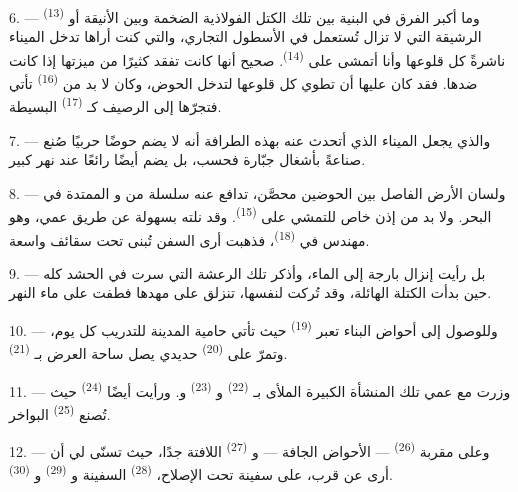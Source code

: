 6. --- وما أكبر الفرق في البنية بين تلك الكتل الفولاذية الضخمة وبين
 الأنيقة أو 
\textsuperscript{(13)} الرشيقة التي لا تزال تُستعمل في الأسطول التجاري، والتي
كنت أراها تدخل الميناء ناشرةً كل قلوعها وأنا أتمشى على 
\textsuperscript{(14)}. صحيح أنها كانت تفقد كثيرًا من ميزتها إذا كانت
 ضدها. فقد كان عليها أن تطوي كل قلوعها لتدخل الحوض، وكان
لا بد من  \textsuperscript{(16)} تأتي فتجرّها إلى الرصيف
كـ \textsuperscript{(17)} البسيطة.

\VUsaut{3.0mm}
\VUsaut{3.0mm}

7. --- والذي يجعل الميناء الذي أتحدث عنه بهذه الطرافة أنه لا يضم حوضًا
حربيًا صُنع صناعةً بأشغال جبّارة فحسب، بل يضم أيضًا 
رائعًا عند  نهر كبير.

8. --- ولسان الأرض الفاصل بين الحوضين محصَّن، تدافع عنه سلسلة من
 و الممتدة في البحر. ولا بد من إذن خاص
للتمشي على  \textsuperscript{(15)}. وقد نلته بسهولة عن طريق
عمي، وهو مهندس في  \textsuperscript{(18)}، فذهبت أرى
السفن تُبنى تحت سقائف واسعة.

9. --- بل رأيت إنزال بارجة إلى الماء، وأذكر تلك الرعشة التي سرت في الحشد
كله حين بدأت الكتلة الهائلة، وقد تُركت لنفسها، تنزلق على مهدها فطفت على
ماء النهر.

10. --- وللوصول إلى أحواض البناء تعبر  \textsuperscript{(19)}
حيث تأتي حامية المدينة للتدريب كل يوم، وتمرّ على 
\textsuperscript{(20)} حديدي يصل ساحة العرض بـ \textsuperscript{(21)}.

\VUsaut{3.0mm}
\VUsaut{3.0mm}

11. --- وزرت مع عمي تلك المنشأة الكبيرة الملأى بـ
\textsuperscript{(22)} و \textsuperscript{(23)} و.
ورأيت أيضًا  \textsuperscript{(24)} حيث تُصنع
 \textsuperscript{(25)} البواخر.

12. --- وعلى مقربة  \textsuperscript{(26)} --- الأحواض الجافة ---
و \textsuperscript{(27)} اللافتة جدًا، حيث تسنّى لي أن
أرى عن قرب، على سفينة تحت الإصلاح،  \textsuperscript{(28)} السفينة
و \textsuperscript{(29)} و \textsuperscript{(30)}.


